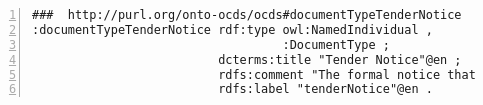 \begin{minipage}{\textwidth}
\begin{lstlisting}[captionpos=b, caption={Extracto de código de la ontología OCDSPY}, label={lst:ocdspyAnexo},  numbers=left,  numberstyle=\tiny\color{mygray},frame=single]
###  http://purl.org/onto-ocds/ocds#documentTypeTenderNotice
:documentTypeTenderNotice rdf:type owl:NamedIndividual ,
                                   :DocumentType ;
                          dcterms:title "Tender Notice"@en ;
                          rdfs:comment "The formal notice that gives details of a tender. This may be a link to a downloadable document, to a web page, or to an official gazette in which the notice is contained."@en ;
                          rdfs:label "tenderNotice"@en .
\end{lstlisting}
\end{minipage}